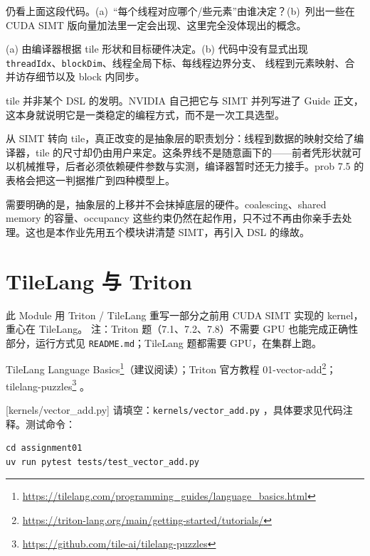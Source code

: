 \documentclass[11pt,a4paper,fontset=fandol]{ctexart}
\begin{document}
仍看上面这段代码。(a)~“每个线程对应哪个/些元素”由谁决定？(b)~列出一些在 CUDA SIMT 版向量加法里一定会出现、这里完全没体现出的概念。

\begin{answer}
(a) 由编译器根据 tile 形状和目标硬件决定。(b) 代码中没有显式出现
\texttt{threadIdx}、\texttt{blockDim}、线程全局下标、每线程边界分支、
线程到元素映射、合并访存细节以及 block 内同步。
\end{answer}

\begin{lookback}
tile 并非某个 DSL 的发明。NVIDIA 自己把它与 SIMT 并列写进了 Guide 正文，这本身就说明它是一类稳定的编程方式，而不是一次工具选型。

从 SIMT 转向 tile，真正改变的是抽象层的职责划分：线程到数据的映射交给了编译器，tile 的尺寸却仍由用户来定。这条界线不是随意画下的——前者凭形状就可以机械推导，后者必须依赖硬件参数与实测，编译器暂时还无力接手。prob 7.5 的表格会把这一判据推广到四种模型上。

需要明确的是，抽象层的上移并不会抹掉底层的硬件。coalescing、shared memory 的容量、occupancy 这些约束仍然在起作用，只不过不再由你亲手去处理。这也是本作业先用五个模块讲清楚 SIMT，再引入 DSL 的缘故。
\end{lookback}

\section{TileLang 与 Triton}

此 Module 用 Triton / TileLang 重写一部分之前用 CUDA SIMT 实现的 kernel，重心在 TileLang。
注：Triton 题（7.1、7.2、7.8）不需要 GPU 也能完成正确性部分，运行方式见 \texttt{README.md}；TileLang 题都需要 GPU，在集群上跑。

\begin{reading}
TileLang Language Basics\footnote{\url{https://tilelang.com/programming_guides/language_basics.html}}（建议阅读）；Triton 官方教程 01-vector-add\footnote{\url{https://triton-lang.org/main/getting-started/tutorials/}}；tilelang-puzzles\footnote{\url{https://github.com/tile-ai/tilelang-puzzles}} 。
\end{reading}

[kernels/vector\_add.py]
请填空：\texttt{kernels/vector\_add.py} ，具体要求见代码注释。测试命令：

\begin{lstlisting}
cd assignment01
uv run pytest tests/test_vector_add.py
\end{lstlisting}
\end{document}
